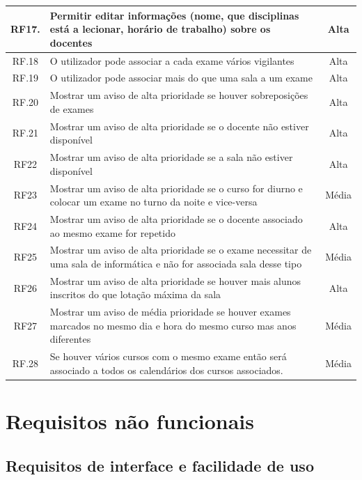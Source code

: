 \documentclass[11pt, twoside]{report}
\begin{document}
\begin{table}[H]
\begin{center}
\begin{tabularx}{\textwidth}{|c|X|c|}
			\hline
			RF17. & Permitir editar informações (nome, que disciplinas está a lecionar, horário de trabalho) sobre os docentes & Alta\\
			\hline
			RF.18 &O utilizador pode associar a cada exame vários vigilantes & Alta\\
			\hline
			RF.19 &	O utilizador pode associar mais do que uma sala a um exame & Alta\\
			\hline
			RF.20 &Mostrar um aviso de alta prioridade se houver sobreposições de exames & Alta\\
			\hline
			RF.21 & Mostrar um aviso de alta prioridade se o docente não estiver disponível & Alta \\
			\hline
			RF22 & Mostrar um aviso de alta prioridade se a sala não estiver disponível & Alta\\
			\hline
			RF23 & Mostrar um aviso de alta prioridade se o curso for diurno e colocar um exame no turno da noite e vice-versa & Média\\
			\hline
			RF24&Mostrar um aviso de alta prioridade se o docente associado ao mesmo exame for repetido & Alta \\
			\hline
			RF25 & Mostrar um aviso de alta prioridade se o exame necessitar de uma sala de informática e não for associada sala desse tipo & Média\\
			\hline
			RF26 & Mostrar um aviso de alta prioridade se houver mais alunos inscritos do que  lotação máxima da sala & Alta\\
			\hline
			RF27 & Mostrar um aviso de média prioridade se houver exames marcados no mesmo dia e hora do mesmo curso mas anos diferentes & Média\\
			\hline
			RF.28 & Se houver vários cursos com o mesmo exame então será associado a todos os calendários dos cursos associados. & Média\\
			\hline
		\end{tabularx}
	\end{center}
\end{table}



	
	\section{Requisitos não funcionais}
	\subsection{Requisitos de interface e facilidade de uso}
\end{document}

